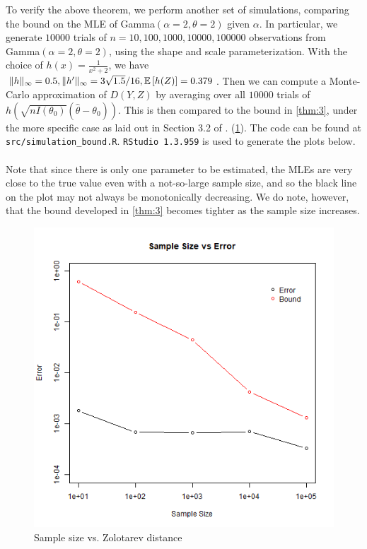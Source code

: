 To verify the above theorem, we perform another set of simulations, comparing the bound on the MLE of Gamma$(\alpha=2,\theta=2)$ given $\alpha$. In particular, we generate $10000$ trials of $n=10,100,1000,10000,100000$ \iid observations from Gamma$(\alpha=2,\theta=2)$, using the shape and scale parameterization. With the choice of $h(x)=\frac{1}{x^2+2}$, we have $\|h\|_\infty = 0.5, \|h'\|_\infty = 3\sqrt{1.5}/16, \mathbb{E}\left[h(Z)\right] = 0.379$. Then we can compute a Monte-Carlo approximation of $D(Y,Z)$ by averaging over all $10000$ trials of $h\left(\sqrt{nI(\theta_0)}(\hat{\theta} - \theta_0)\right)$. This is then compared to the bound in \cref{thm:3}, under the more specific case as laid out in Section 3.2 of \cite{anastasiou2015bounds}. (\cref{simulation}). The code can be found at \texttt{src/simulation\_bound.R}. \texttt{RStudio 1.3.959} is used to generate the plots below.\\\\
Note that since there is only one parameter to be estimated, the MLEs are very close to the true value even with a not-so-large sample size, and so the black line on the plot may not always be monotonically decreasing. We do note, however, that the bound developed in \cref{thm:3} becomes tighter as the sample size increases.
\begin{figure}[h]
\includegraphics[scale=0.4]{../../../misc/rplot.jpg}
\centering
\caption{Sample size vs. Zolotarev distance}
\label{simulation}
\end{figure}$ $\\
